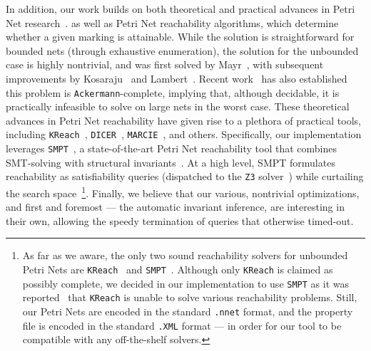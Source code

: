 In addition, our work builds on both theoretical and practical advances in 
Petri Net research~\cite{Mu89, Es96, Re12, EsNi24}. 
%
as well as Petri Net reachability algorithms, 
which determine whether a given marking is attainable. While the solution is 
straightforward for bounded nets (through exhaustive enumeration), the solution 
for the unbounded case is highly nontrivial, and was first solved by 
Mayr~\cite{Ma81}, with subsequent improvements by Kosaraju~\cite{Ko82} and 
Lambert~\cite{La92}. Recent work~\cite{CzWo22} has also established this 
problem is \texttt{Ackermann}-complete, implying that, although decidable, it 
is practically infeasible to solve on large nets in the worst case.
%
These theoretical advances in Petri Net reachability have given rise to a 
plethora of practical tools, including \texttt{KReach}~\cite{DiLa20}, 
\texttt{DICER}~\cite{XiZhLi21}, \texttt{MARCIE}~\cite{HeRoSc13}, and others. 
%
Specifically, our implementation leverages \texttt{SMPT}~\cite{AmDa23}, a 
state-of-the-art Petri Net reachability tool that combines SMT-solving with 
structural invariants~\cite{AmBeDa21, AmDaHu22}. At a high level, SMPT 
formulates reachability as satisfiability queries (dispatched to the 
\texttt{Z3} 
solver~\cite{DeBj08}) while curtailing the search space~\footnote{As far as we 
aware, the only two sound reachability solvers for unbounded Petri Nets are 
\texttt{KReach}~\cite{DiLa20} and \texttt{SMPT}~\cite{AmDa23}. Although only 
\texttt{KReach} is claimed as possibly complete, we decided in our 
implementation to use \texttt{SMPT} as it was 
reported~\cite{Am23} that \texttt{KReach} is unable to solve various 
reachability 
problems. 
Still, our Petri Nets are encoded in the standard \texttt{.nnet} format, and 
the property file is encoded in the standard \texttt{.XML} format --- in order 
for our tool to be compatible with any off-the-shelf solvers.
}.
%
%
Finally, we believe that our various, nontrivial optimizations, and first and 
foremost --- the automatic invariant inference, are interesting in their own, 
allowing the speedy termination of queries that otherwise timed-out. 

